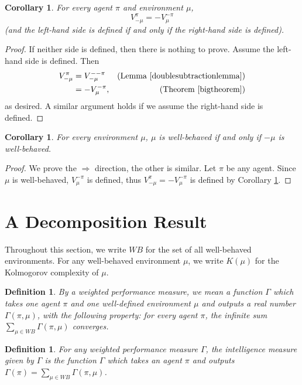\documentclass{article}
\newtheorem{definition}[theorem]{Definition}
\newtheorem{corollary}[theorem]{Corollary}
\begin{document}
\begin{corollary}
\label{twistcorollary}
    For every agent $\pi$ and environment $\mu$,
    \[V^\pi_{-\mu}=-V^{-\pi}_{\mu}\]
    (and the left-hand side is defined if and only if the right-hand side is defined).
\end{corollary}

\begin{proof}
    If neither side is defined, then there is nothing to prove.
    Assume the left-hand side is defined. Then
    \begin{align*}
        V^\pi_{-\mu} &= V^{--\pi}_{-\mu} &\mbox{(Lemma \ref{doublesubtractionlemma})}\\
            &= -V^{-\pi}_\mu, &\mbox{(Theorem \ref{bigtheorem})}
    \end{align*}
    as desired. A similar argument holds if we assume the right-hand side is defined.
\end{proof}

\begin{corollary}
    For every environment $\mu$, $\mu$ is well-behaved if and only if $-\mu$
    is well-behaved.
\end{corollary}

\begin{proof}
    We prove the $\Rightarrow$ direction, the other is similar.
    Let $\pi$ be any agent. Since $\mu$ is well-behaved, $V^{-\pi}_\mu$ is defined,
    thus $V^\pi_{-\mu}=-V^{-\pi}_\mu$ is defined by Corollary \ref{twistcorollary}.
\end{proof}

\section{A Decomposition Result}

Throughout this section, we write $WB$ for the set of all well-behaved
environments. For any well-behaved environment $\mu$, we write $K(\mu)$
for the Kolmogorov complexity of $\mu$.

\begin{definition}
    By a \emph{weighted performance measure},
    we mean a function $\Gamma$ which takes one agent $\pi$
    and one well-defined environment $\mu$ and outputs
    a real number $\Gamma(\pi,\mu)$, with the following property:
    for every agent $\pi$, the infinite sum
    $\sum_{\mu\in WB}\Gamma(\pi,\mu)$ converges.
\end{definition}

\begin{definition}
    For any weighted performance measure $\Gamma$, the
    \emph{intelligence measure given by $\Gamma$} is the function
    $\Gamma$ which takes an agent $\pi$ and outputs
    $\Gamma(\pi)=\sum_{\mu\in WB}\Gamma(\pi,\mu)$.
\end{definition}
\end{document}
